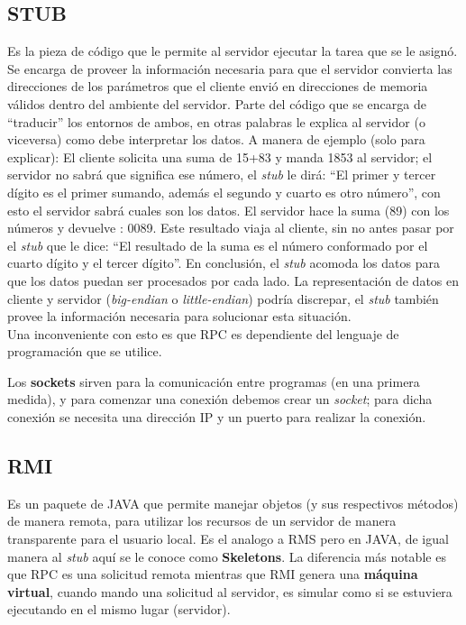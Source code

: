 \documentclass[
	12pt, %
	fleqn, %
	a4paper, %
	oneside, %
]{LegrandOrangeBook}
\begin{document}
\subsection*{STUB}
Es la pieza de código que le permite al servidor ejecutar la tarea que se le asignó. Se encarga de proveer la información necesaria para que el servidor convierta las direcciones de los parámetros que el cliente envió en direcciones de memoria válidos dentro del ambiente del servidor. Parte del código que se encarga de ``traducir'' los entornos de ambos, en otras palabras le explica al servidor (o viceversa) como debe interpretar los datos. A manera de ejemplo (solo para explicar): El cliente solicita una suma de 15+83 y manda 1853 al servidor; el servidor no sabrá que significa ese número, el \textit{stub} le dirá: ``El primer y tercer dígito es el primer sumando, además el segundo y cuarto es otro número'', 
con esto el servidor sabrá cuales son los datos. El servidor hace la suma (89) con los números y devuelve : 0089. Este resultado viaja al cliente, sin no antes pasar por el \textit{stub} que le dice: ``El resultado de la suma es el número conformado por el cuarto dígito y el tercer dígito''. En conclusión, el \textit{stub} acomoda los datos para que los datos puedan ser procesados por cada lado.
La representación de datos en cliente y servidor (\textit{big-endian} o \textit{little-endian}) podría discrepar, el \textit{stub} también provee la información necesaria para solucionar esta situación.\\
Una inconveniente con esto es que RPC es dependiente del lenguaje de programación que se utilice.
\begin{definition}[Socket]
Los \textbf{sockets} sirven para la comunicación entre programas (en una primera medida), y para comenzar una conexión debemos crear un \textit{socket}; para dicha conexión se necesita una dirección IP y un puerto para realizar la conexión.
\end{definition}
\subsection{RMI}
Es un paquete de JAVA que permite manejar objetos (y sus respectivos métodos) de manera remota, para utilizar los recursos de un servidor de manera transparente para el usuario local. Es el analogo a RMS pero en JAVA, de igual manera al \textit{stub} aquí se le conoce como \textbf{Skeletons}. La diferencia más notable es que RPC es una solicitud remota mientras que RMI genera una \textbf{máquina virtual}, cuando mando una solicitud al servidor, es simular como si se estuviera ejecutando en el mismo lugar (servidor).
\end{document}
